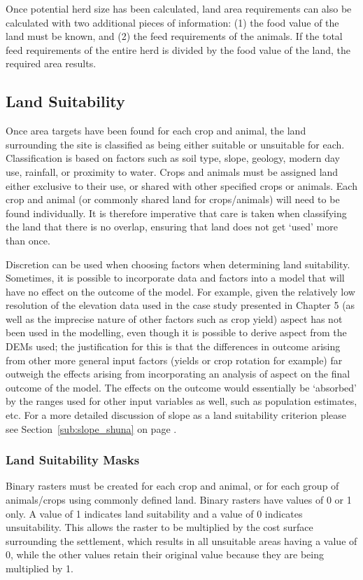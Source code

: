 Once potential herd size has been calculated, land area requirements can also be calculated with two additional pieces of information: %
(1) the food value of the land must be known, and %
(2) the feed requirements of the animals. If the total feed requirements of the entire herd is divided by the food value of the land, the required area results.

\subsection{Land Suitability} 
  \label{LandSuitability}
Once area targets have been found for each crop and animal, the land surrounding the site is classified as being either suitable or unsuitable for each. Classification is based on factors such as soil type, slope, geology, modern day use, rainfall, or proximity to water.  Crops and animals must be assigned land either exclusive to their use, or shared with other specified crops or animals. Each crop and animal (or commonly shared land for crops/animals) will need to be found individually. It is therefore imperative that care is taken when classifying the land that there is no overlap, ensuring that land does not get `used' more than once. 

Discretion can be used when choosing factors when determining land suitability.  Sometimes, it is possible to incorporate data and factors into a model that will have no effect on the outcome of the model.  For example, given the relatively low resolution of the elevation data used in the case study presented in Chapter 5 (as well as the imprecise nature of other factors such as crop yield) aspect has not been used in the modelling, even though it is possible to derive aspect from the DEMs used; the justification for this is that the differences in outcome arising from other more general input factors (yields or crop rotation for example) far outweigh the effects arising from incorporating an analysis of aspect on the final outcome of the model.  The effects on the outcome would essentially be `absorbed' by the ranges used for other input variables as well, such as population estimates, etc.  For a more detailed discussion of slope as a land suitability criterion please see Section~\ref{sub:slope_shuna} on page \pageref{sub:slope_shuna}.

\subsubsection{Land Suitability Masks}
	\label{LandSuitabilityMasks}
Binary rasters must be created for each crop and animal, or for each group of animals/crops using commonly defined land. Binary rasters have values of 0 or 1 only. A value of 1 indicates land suitability and a value of 0 indicates unsuitability. This allows the raster to be multiplied by the cost surface surrounding the settlement, which results in all unsuitable areas having a value of 0, while the other values retain their original value because they are being multiplied by 1.

